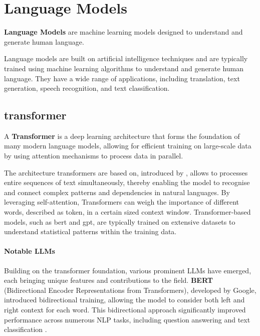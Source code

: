 \section{Language Models}\label{sec:language-models}
%
\begin{definition}\label{def:language-models}
    \textbf{Language Models} are machine learning models designed to understand and generate human language.
\end{definition}
Language models are built on artificial intelligence techniques and are typically trained using machine learning algorithms to understand and generate human language. 
They have a wide range of applications, including translation, text generation, speech recognition, and text classification.
\subsection{transformer}\label{transformer}
\begin{definition}\label{def:transformer}
    A \textbf{Transformer} is a deep learning architecture that forms the foundation of many modern language models, allowing for efficient training on large-scale data by using attention mechanisms to process data in parallel.
\end{definition}
The architecture transformers are based on, introduced by \citet{vaswani2017attention}, allows to processes entire sequences of text simultaneously, thereby enabling the model to recognise and connect complex patterns and dependencies in natural languages. 
By leveraging self-attention, Transformers can weigh the importance of different words, described as token, in a certain sized context window. 
Transformer-based models, such as \ac{bert} and \ac{gpt}, are typically trained on extensive datasets to understand statistical patterns within the training data.\citep{atallah2023impact}

\paragraph{Notable LLMs} Building on the transformer foundation, various prominent LLMs have emerged, each bringing unique features and contributions to the field. \textbf{BERT} (Bidirectional Encoder Representations from Transformers), developed by Google, introduced bidirectional training, allowing the model to consider both left and right context for each word. This bidirectional approach significantly improved performance across numerous NLP tasks, including question answering and text classification \citep{devlin2019bert}. 

